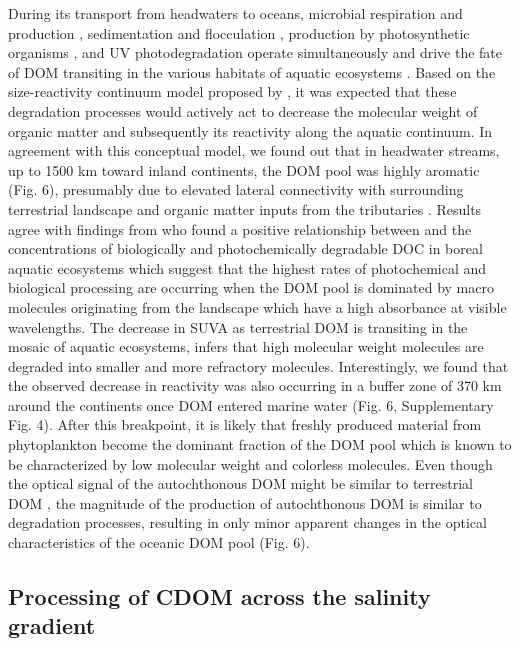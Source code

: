 During its transport from headwaters to oceans, microbial respiration and production \citep{DelGiorgio1997, Kritzberg2006, Berggren2010}, sedimentation and flocculation \citep{Sholkovitz1976, VonWachenfeldt2008}, production by photosynthetic organisms \citep{Descy2002, Kritzberg2005, Lapierre2009}, and UV photodegradation \citep{Benner1999, Amado2006, Zhang2009} operate simultaneously and drive the fate of DOM transiting in the various habitats of aquatic ecosystems \citep{Massicotte2013LOFE}. Based on the size-reactivity continuum model proposed by \citet{Amon1996}, it was expected that these degradation processes would actively act to decrease the molecular weight of organic matter and subsequently its reactivity along the aquatic continuum. In agreement with this conceptual model, we found out that in headwater streams, up to 1500 km toward inland continents, the DOM pool was highly aromatic (Fig. 6), presumably due to elevated lateral connectivity with surrounding terrestrial landscape and organic matter inputs from the tributaries \citep{Massicotte2011EA, Lambert2016}. Results agree with findings from \citet{Lapierre2013} who found a positive relationship between  and the concentrations of biologically and photochemically degradable DOC in boreal aquatic ecosystems which suggest that the highest rates of photochemical and biological processing are occurring when the DOM pool is dominated by macro molecules originating from the landscape which have a high absorbance at visible wavelengths. The decrease in SUVA as terrestrial DOM is transiting in the mosaic of aquatic ecosystems, infers that high molecular weight molecules are degraded into smaller and more refractory molecules. Interestingly, we found that the observed decrease in reactivity was also occurring in a buffer zone of 370 km around the continents once DOM entered marine water (Fig. 6, Supplementary Fig. 4). After this breakpoint, it is likely that freshly produced material from phytoplankton become the dominant fraction of the DOM pool which is known to be characterized by low molecular weight and colorless molecules. Even though the optical signal of the autochthonous DOM might be similar to terrestrial DOM \citep{Yamashita2004}, the magnitude of the production of autochthonous DOM is similar to degradation processes, resulting in only minor apparent changes in the optical characteristics of the oceanic DOM pool (Fig. 6).

\subsection*{Processing of CDOM across the salinity gradient}

